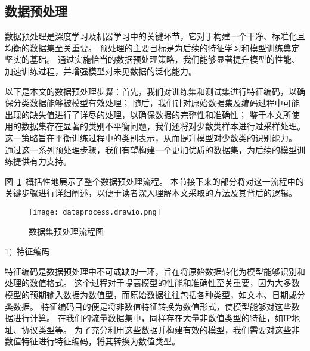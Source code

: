 \subsection{数据预处理}
数据预处理是深度学习及机器学习中的关键环节，它对于构建一个干净、标准化且均衡的数据集至关重要。
预处理的主要目标是为后续的特征学习和模型训练奠定坚实的基础。
通过实施恰当的数据预处理策略，我们能够显著提升模型的性能、加速训练过程，并增强模型对未见数据的泛化能力。\par

以下是本文的数据预处理步骤：首先，我们对训练集和测试集进行特征编码，以确保分类数据能够被模型有效处理；
随后，我们针对原始数据集及编码过程中可能出现的缺失值进行了详尽的处理，以确保数据的完整性和准确性；
鉴于本文所使用的数据集存在显著的类别不平衡问题，我们还将对少数类样本进行过采样处理。
这一策略旨在平衡训练过程中的类别表示，从而提升模型对少数类的识别能力。
通过这一系列预处理步骤，我们有望构建一个更加优质的数据集，为后续的模型训练提供有力支持。\par

图~\ref{fig:dataprocess}~概括性地展示了整个数据预处理流程。
本节接下来的部分将对这一流程中的关键步骤进行详细阐述，以便于读者深入理解本文采取的方法及其背后的逻辑。
\begin{figure}[htbp]
	\centering
	\texttt{[image: dataprocess.drawio.png]}
	\caption{数据集预处理流程图}
	\label{fig:dataprocess}
\end{figure}

1)~特征编码\par

特征编码是数据预处理中不可或缺的一环，旨在将原始数据转化为模型能够识别和处理的数值格式。
这个过程对于提高模型的性能和准确性至关重要，因为大多数模型的预期输入数据为数值型，而原始数据往往包括各种类型，如文本、日期或分类数据。
特征编码目的便是将非数值特征转换为数值形式，使模型能够对这些数据进行计算。
在我们的流量数据集中，同样存在大量非数值类型的特征，如IP地址、协议类型等。
为了充分利用这些数据并构建有效的模型，我们需要对这些非数值特征进行特征编码，将其转换为数值类型。\par

